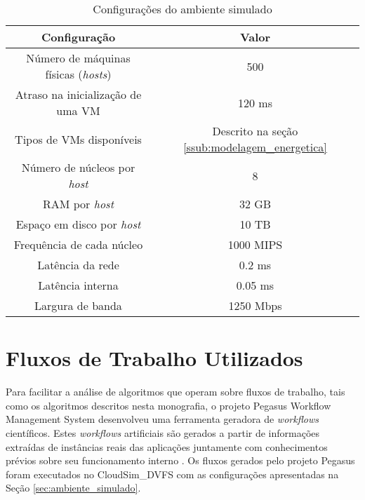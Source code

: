 \begin{table}
	\centering
    \begin{tabular}{c|c}
    \hline
    \textbf{Configuração}                     & \textbf{Valor}                                    \\ \hline
    Número de máquinas físicas (\emph{hosts}) & 500                                               \\
    Atraso na inicialização de uma VM         & 120 ms                                            \\
    Tipos de VMs disponíveis                  & Descrito na seção \ref{ssub:modelagem_energetica} \\
    Número de núcleos por \emph{host}         & 8                                                 \\
    RAM por \emph{host}                       & 32 GB                                             \\
    Espaço em disco por \emph{host}           & 10 TB                                             \\
    Frequência de cada núcleo                 & 1000 MIPS                                         \\
    Latência da rede                          & 0.2 ms                                            \\
    Latência interna                          & 0.05 ms                                           \\
    Largura de banda                          & 1250 Mbps                                         \\ \hline
    \end{tabular}
    \caption{Configurações do ambiente simulado}
    \label{tab:configuracoes_cloudsim_dvfs}
\end{table}


\section{Fluxos de Trabalho Utilizados}
\label{sec:fluxos_trabalho}

Para facilitar a análise de algoritmos que operam sobre fluxos de trabalho, tais
como os algoritmos descritos nesta monografia, o projeto Pegasus Workflow
Management System desenvolveu uma ferramenta geradora de \emph{workflows}
científicos. Estes \emph{workflows} artificiais são gerados a partir de
informações extraídas de instâncias reais das aplicações juntamente com
conhecimentos prévios sobre seu funcionamento interno
\cite{pegasus:workflowgenerator}. Os fluxos gerados pelo projeto Pegasus foram
executados no CloudSim\_DVFS com as configurações apresentadas na Seção
\ref{sec:ambiente_simulado}.


